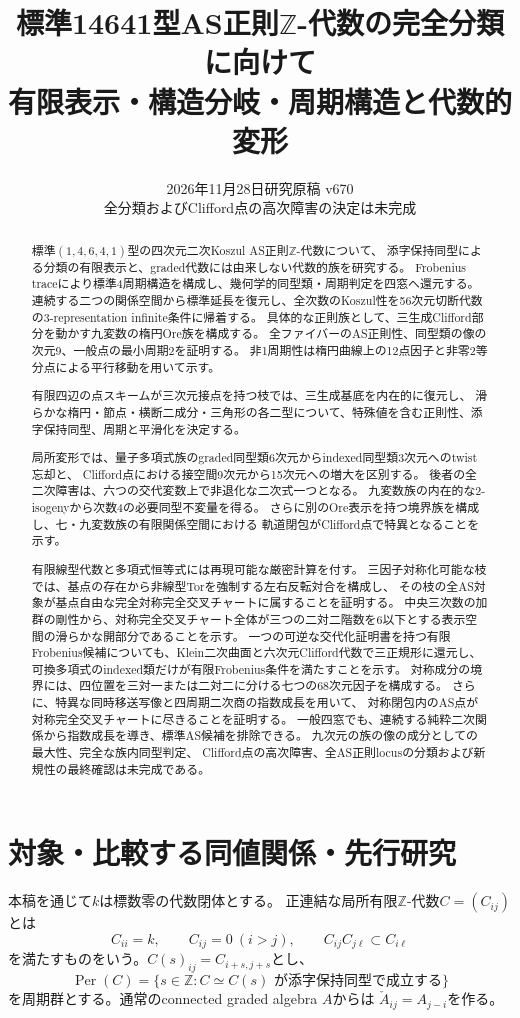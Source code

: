 \documentclass[11pt,a4paper]{ltjsarticle}
\title{標準14641型AS正則$\mathbb Z$-代数の完全分類に向けて\\
\large 有限表示・構造分岐・周期構造と代数的変形}
\author{}
\date{2026年11月28日\quad 研究原稿 v670\\
\small 全分類およびClifford点の高次障害の決定は未完成}
\theoremstyle{definition}
\newcommand{\ZZ}{\mathbb Z}
\newcommand{\Per}{\operatorname{Per}}
\begin{document}
\maketitle
\begin{abstract}
標準$(1,4,6,4,1)$型の四次元二次Koszul AS正則$\ZZ$-代数について、
添字保持同型による分類の有限表示と、graded代数には由来しない代数的族を研究する。
Frobenius traceにより標準4周期構造を構成し、幾何学的同型類・周期判定を四窓へ還元する。
連続する二つの関係空間から標準延長を復元し、全次数のKoszul性を56次元切断代数の3-representation infinite条件に帰着する。
具体的な正則族として、三生成Clifford部分を動かす九変数の楕円Ore族を構成する。
全ファイバーのAS正則性、同型類の像の次元9、一般点の最小周期2を証明する。
非1周期性は楕円曲線上の12点因子と非零2等分点による平行移動を用いて示す。

有限四辺の点スキームが三次元接点を持つ枝では、三生成基底を内在的に復元し、
滑らかな楕円・節点・横断二成分・三角形の各二型について、特殊値を含む正則性、添字保持同型、周期と平滑化を決定する。

局所変形では、量子多項式族のgraded同型類6次元からindexed同型類3次元へのtwist忘却と、
Clifford点における接空間9次元から15次元への増大を区別する。
後者の全二次障害は、六つの交代変数上で非退化な二次式一つとなる。
九変数族の内在的な2-isogenyから次数4の必要同型不変量を得る。
さらに別のOre表示を持つ境界族を構成し、七・九変数族の有限関係空間における
軌道閉包がClifford点で特異となることを示す。

有限線型代数と多項式恒等式には再現可能な厳密計算を付す。
三因子対称化可能な枝では、基点の存在から非線型Torを強制する左右反転対合を構成し、
その枝の全AS対象が基点自由な完全対称完全交叉チャートに属することを証明する。
中央三次数の加群の剛性から、対称完全交叉チャート全体が三つの二対二階数を6以下とする表示空間の滑らかな開部分であることを示す。
一つの可逆な交代化証明書を持つ有限Frobenius候補についても、Klein二次曲面と六次元Clifford代数で三正規形に還元し、
可換多項式のindexed類だけが有限Frobenius条件を満たすことを示す。
対称成分の境界には、四位置を三対一または二対二に分ける七つの68次元因子を構成する。
さらに、特異な同時移送写像と四周期二次商の指数成長を用いて、
対称閉包内のAS点が対称完全交叉チャートに尽きることを証明する。
一般四窓でも、連続する純粋二次関係から指数成長を導き、標準AS候補を排除できる。
九次元の族の像の成分としての最大性、完全な族内同型判定、
Clifford点の高次障害、全AS正則locusの分類および新規性の最終確認は未完成である。
\end{abstract}
\tableofcontents

\section{対象・比較する同値関係・先行研究}
本稿を通じて$k$は標数零の代数閉体とする。
正連結な局所有限$\ZZ$-代数$C=(C_{ij})$とは
\[
 C_{ii}=k,\qquad C_{ij}=0\ (i>j),\qquad C_{ij}C_{j\ell}\subset C_{i\ell}
\]
を満たすものをいう。$C(s)_{ij}=C_{i+s,j+s}$とし、
\[
 \Per(C)=\{s\in\ZZ:C\simeq C(s)\text{ が添字保持同型で成立する}\}
\]
を周期群とする。通常のconnected graded algebra $A$からは
$\check A_{ij}=A_{j-i}$を作る。
\end{document}
